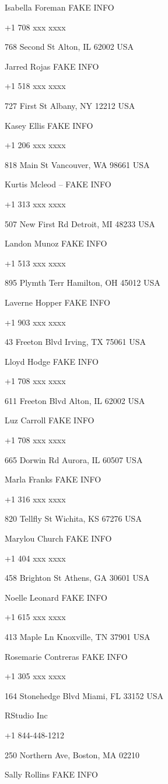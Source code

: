 \documentclass[]{book}
\theoremstyle{definition}
\theoremstyle{definition}
\theoremstyle{definition}
\theoremstyle{remark}
\begin{document}
Isabella Foreman FAKE INFO

+1 708 xxx xxxx

768 Second St Alton, IL 62002 USA

Jarred Rojas FAKE INFO

+1 518 xxx xxxx

727 First St Albany, NY 12212 USA

Kasey Ellis FAKE INFO

+1 206 xxx xxxx

818 Main St Vancouver, WA 98661 USA

Kurtis Mcleod -- FAKE INFO

+1 313 xxx xxxx

507 New First Rd Detroit, MI 48233 USA

Landon Munoz FAKE INFO

+1 513 xxx xxxx

895 Plymth Terr Hamilton, OH 45012 USA

Laverne Hopper FAKE INFO

+1 903 xxx xxxx

43 Freeton Blvd Irving, TX 75061 USA

Lloyd Hodge FAKE INFO

+1 708 xxx xxxx

611 Freeton Blvd Alton, IL 62002 USA

Luz Carroll FAKE INFO

+1 708 xxx xxxx

665 Dorwin Rd Aurora, IL 60507 USA

Marla Franks FAKE INFO

+1 316 xxx xxxx

820 Tellfly St Wichita, KS 67276 USA

Marylou Church FAKE INFO

+1 404 xxx xxxx

458 Brighton St Athens, GA 30601 USA

Noelle Leonard FAKE INFO

+1 615 xxx xxxx

413 Maple Ln Knoxville, TN 37901 USA

Rosemarie Contreras FAKE INFO

+1 305 xxx xxxx

164 Stonehedge Blvd Miami, FL 33152 USA

RStudio Inc

+1 844-448-1212

250 Northern Ave, Boston, MA 02210

Sally Rollins FAKE INFO
\end{document}
